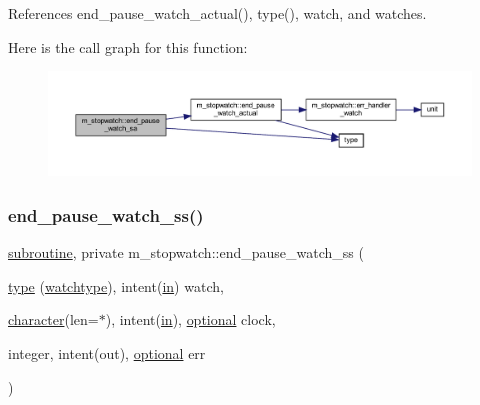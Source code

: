 References end\+\_\+pause\+\_\+watch\+\_\+actual(), type(), watch, and watches.

Here is the call graph for this function\+:
\nopagebreak
\begin{figure}[H]
\begin{center}
\leavevmode
\includegraphics[width=350pt]{namespacem__stopwatch_a4e478402d1066b90c1807d5fddb7e803_cgraph}
\end{center}
\end{figure}
\mbox{\label{namespacem__stopwatch_a1aeced31682c43f2ead6efaf679cad8c}} 
\subsubsection{\texorpdfstring{end\+\_\+pause\+\_\+watch\+\_\+ss()}{end\_pause\_watch\_ss()}}
{\footnotesize\ttfamily \hyperlink{M__stopwatch_83_8txt_acfbcff50169d691ff02d4a123ed70482}{subroutine}, private m\+\_\+stopwatch\+::end\+\_\+pause\+\_\+watch\+\_\+ss (\begin{DoxyParamCaption}\item[{\hyperlink{stop__watch_83_8txt_a70f0ead91c32e25323c03265aa302c1c}{type} (\hyperlink{structm__stopwatch_1_1watchtype}{watchtype}), intent(\hyperlink{M__journal_83_8txt_afce72651d1eed785a2132bee863b2f38}{in})}]{watch,  }\item[{\hyperlink{option__stopwatch_83_8txt_abd4b21fbbd175834027b5224bfe97e66}{character}(len=$\ast$), intent(\hyperlink{M__journal_83_8txt_afce72651d1eed785a2132bee863b2f38}{in}), \hyperlink{option__stopwatch_83_8txt_aa4ece75e7acf58a4843f70fe18c3ade5}{optional}}]{clock,  }\item[{integer, intent(out), \hyperlink{option__stopwatch_83_8txt_aa4ece75e7acf58a4843f70fe18c3ade5}{optional}}]{err }\end{DoxyParamCaption})\hspace{0.3cm}{\ttfamily [private]}}



